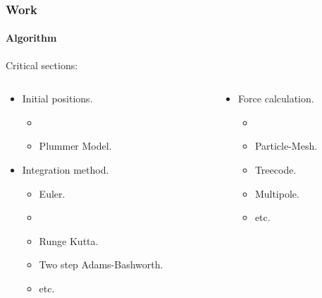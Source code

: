 \frame
{
\frametitle{Work}
\framesubtitle{Algorithm}
Critical sections:
\begin{columns}
    \begin{column}{0.5\textwidth}
        \begin{itemize}
            \item Initial positions.
            \begin{itemize}
                \item {}
                \item Plummer Model.
            \end{itemize}
            \item Integration method.
            \begin{itemize}
                \item Euler.
                \item {}
                \item Runge Kutta.
                \item Two step Adams-Bashworth.
                \item etc.
            \end{itemize}
        \end{itemize}
    \end{column}
    \begin{column}{0.5\textwidth}
        \begin{itemize}
            \item Force calculation.
            \begin{itemize}
                \item {} 
                \item Particle-Mesh.  
                \item Treecode. 
                \item Multipole. 
                \item etc.
            \end{itemize}
        \end{itemize}
    \end{column}
\end{columns}
}


